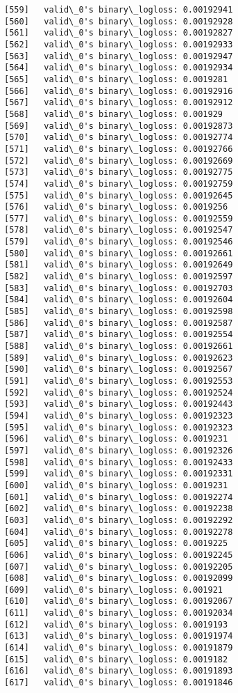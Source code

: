 \documentclass[11pt]{article}
\begin{document}
\begin{Verbatim}[commandchars=\\\{\}]
[559]	valid\_0's binary\_logloss: 0.00192941
[560]	valid\_0's binary\_logloss: 0.00192928
[561]	valid\_0's binary\_logloss: 0.00192827
[562]	valid\_0's binary\_logloss: 0.00192933
[563]	valid\_0's binary\_logloss: 0.00192947
[564]	valid\_0's binary\_logloss: 0.00192934
[565]	valid\_0's binary\_logloss: 0.0019281
[566]	valid\_0's binary\_logloss: 0.00192916
[567]	valid\_0's binary\_logloss: 0.00192912
[568]	valid\_0's binary\_logloss: 0.001929
[569]	valid\_0's binary\_logloss: 0.00192873
[570]	valid\_0's binary\_logloss: 0.00192774
[571]	valid\_0's binary\_logloss: 0.00192766
[572]	valid\_0's binary\_logloss: 0.00192669
[573]	valid\_0's binary\_logloss: 0.00192775
[574]	valid\_0's binary\_logloss: 0.00192759
[575]	valid\_0's binary\_logloss: 0.00192645
[576]	valid\_0's binary\_logloss: 0.0019256
[577]	valid\_0's binary\_logloss: 0.00192559
[578]	valid\_0's binary\_logloss: 0.00192547
[579]	valid\_0's binary\_logloss: 0.00192546
[580]	valid\_0's binary\_logloss: 0.00192661
[581]	valid\_0's binary\_logloss: 0.00192649
[582]	valid\_0's binary\_logloss: 0.00192597
[583]	valid\_0's binary\_logloss: 0.00192703
[584]	valid\_0's binary\_logloss: 0.00192604
[585]	valid\_0's binary\_logloss: 0.00192598
[586]	valid\_0's binary\_logloss: 0.00192587
[587]	valid\_0's binary\_logloss: 0.00192554
[588]	valid\_0's binary\_logloss: 0.00192661
[589]	valid\_0's binary\_logloss: 0.00192623
[590]	valid\_0's binary\_logloss: 0.00192567
[591]	valid\_0's binary\_logloss: 0.00192553
[592]	valid\_0's binary\_logloss: 0.00192524
[593]	valid\_0's binary\_logloss: 0.00192443
[594]	valid\_0's binary\_logloss: 0.00192323
[595]	valid\_0's binary\_logloss: 0.00192323
[596]	valid\_0's binary\_logloss: 0.0019231
[597]	valid\_0's binary\_logloss: 0.00192326
[598]	valid\_0's binary\_logloss: 0.00192433
[599]	valid\_0's binary\_logloss: 0.00192331
[600]	valid\_0's binary\_logloss: 0.0019231
[601]	valid\_0's binary\_logloss: 0.00192274
[602]	valid\_0's binary\_logloss: 0.00192238
[603]	valid\_0's binary\_logloss: 0.00192292
[604]	valid\_0's binary\_logloss: 0.00192278
[605]	valid\_0's binary\_logloss: 0.0019225
[606]	valid\_0's binary\_logloss: 0.00192245
[607]	valid\_0's binary\_logloss: 0.00192205
[608]	valid\_0's binary\_logloss: 0.00192099
[609]	valid\_0's binary\_logloss: 0.001921
[610]	valid\_0's binary\_logloss: 0.00192067
[611]	valid\_0's binary\_logloss: 0.00192034
[612]	valid\_0's binary\_logloss: 0.0019193
[613]	valid\_0's binary\_logloss: 0.00191974
[614]	valid\_0's binary\_logloss: 0.00191879
[615]	valid\_0's binary\_logloss: 0.0019182
[616]	valid\_0's binary\_logloss: 0.00191893
[617]	valid\_0's binary\_logloss: 0.00191846

\end{Verbatim}
\end{document}
